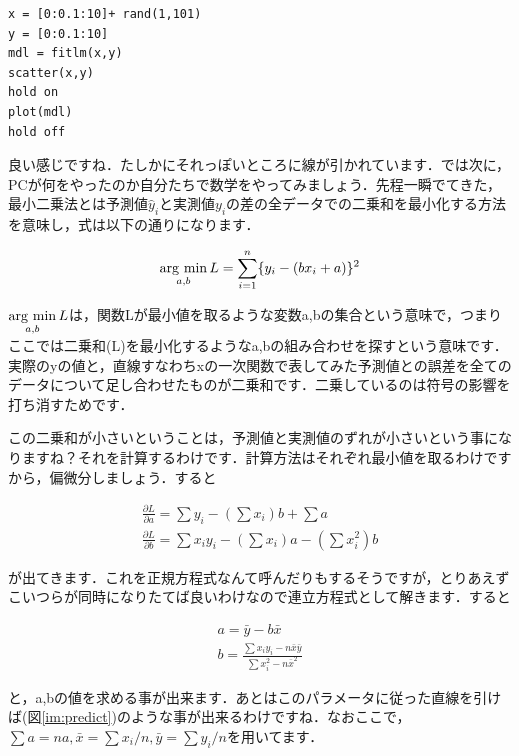 \documentclass[11pt,a4paper]{jreport}
\newcommand{\argmin}{\mathop{\rm arg~min}\limits}
\begin{document}
\begin{lstlisting}[caption=単回帰のコード,label=sc:scatter]
x = [0:0.1:10]+ rand(1,101)
y = [0:0.1:10]
mdl = fitlm(x,y)
scatter(x,y)
hold on
plot(mdl)
hold off
\end{lstlisting}

良い感じですね．たしかにそれっぽいところに線が引かれています．では次に，PCが何をやったのか自分たちで数学をやってみましょう．先程一瞬でてきた，最小二乗法とは予測値$\hat y_i$と実測値$y_i$の差の全データでの二乗和を最小化する方法を意味し，式は以下の通りになります．

\begin{eqnarray}
\argmin_{a,b} L = \sum_{i=1}^n \{ y_i - (bx_i + a) \}^2
\end{eqnarray}

$\argmin_{a,b} L$は，関数Lが最小値を取るような変数a,bの集合という意味で，つまりここでは二乗和(L)を最小化するようなa,bの組み合わせを探すという意味です．実際のyの値と，直線すなわちxの一次関数で表してみた予測値との誤差を全てのデータについて足し合わせたものが二乗和です．二乗しているのは符号の影響を打ち消すためです．

この二乗和が小さいということは，予測値と実測値のずれが小さいという事になりますね？それを計算するわけです．計算方法はそれぞれ最小値を取るわけですから，偏微分しましょう．すると

\begin{eqnarray}
\frac{\partial L}{\partial a} = \sum y_i -(\sum x_i)b + \sum a \\
\frac{\partial L}{\partial b} = \sum x_i y_i - (\sum x_i)a- (\sum x_i^2)b
\end{eqnarray}

が出てきます．これを正規方程式なんて呼んだりもするそうですが，とりあえずこいつらが同時になりたてば良いわけなので連立方程式として解きます．すると

\begin{eqnarray}
a = \bar y - b\bar x\\
b = \frac{\sum x_i y_i - n \bar{x} \bar{y}}{\sum x_i^2 - n\bar{x}^2}
\end{eqnarray}

と，a,bの値を求める事が出来ます．あとはこのパラメータに従った直線を引けば(図\ref{im:predict})のような事が出来るわけですね．なおここで，$\sum a = na, \bar x = \sum x_i/n, \bar y = \sum y_i/n$を用いてます．
\end{document}

